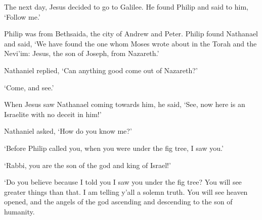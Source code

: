 The next day, 
Jesus decided to go to Galilee.
He found Philip and said to him,
`Follow me.'

Philip was from Bethsaida,
the city of Andrew and Peter.
Philip found Nathanael and said, 
`We have found the one whom 
Moses wrote about in the Torah and the Nevi'im: 
Jesus, the son of Joseph, from Nazareth.'

Nathaniel replied, `Can anything good come out of Nazareth?'

`Come, and see.'

When Jesus saw Nathanael coming towards him, he said,
`See, now here is an Israelite with no deceit in him!'

Nathaniel asked, `How do you know me?'

`Before Philip called you, when you were under the fig tree,
I saw you.'

`Rabbi, you are the son of the god and king of Israel!'

`Do you believe because I told you I saw you under the fig tree?
You will see greater things than that.
I am telling y'all a solemn truth.
You will see heaven opened, 
and the angels of the god ascending and descending 
to the son of humanity.